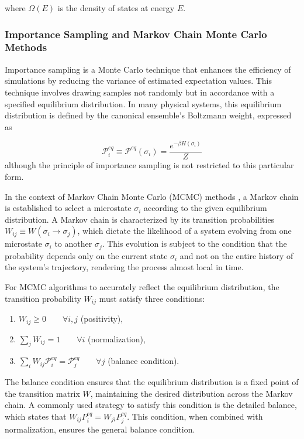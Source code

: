 where $\Omega(E)$ is the density of states at energy $E$.

\subsubsection{Importance Sampling and Markov Chain Monte Carlo Methods}

Importance sampling \cite{Tokdar2009} is a Monte Carlo technique that enhances
the efficiency of simulations by reducing the variance of estimated expectation
values. This technique involves drawing samples not randomly but in accordance
with a specified equilibrium distribution. In many physical systems, this
equilibrium distribution is defined by the canonical ensemble's Boltzmann
weight, expressed as 

\begin{equation}
    \mathcal{P}^{eq}_i \equiv \mathcal{P}^{eq}(\sigma_i) = \frac{e^{-\beta H(\sigma_i)}}{Z}
\end{equation}
although the principle of importance sampling is not restricted to this
particular form.

In the context of Markov Chain Monte Carlo (MCMC) methods \cite{Brooks1998}, a
Markov chain is established to select a microstate \( \sigma_i \) according to
the given equilibrium distribution. A Markov chain is characterized by its
transition probabilities \( W_{ij} \equiv W(\sigma_i \rightarrow \sigma_j) \),
which dictate the likelihood of a system evolving from one microstate \(
\sigma_i \) to another \( \sigma_j \). This evolution is subject to the
condition that the probability depends only on the current state \( \sigma_i \)
and not on the entire history of the system's trajectory, rendering the process
almost local in time.

For MCMC algorithms to accurately reflect the equilibrium distribution, the
transition probability \( W_{ij} \) must satisfy three conditions:

\begin{enumerate}
    \item \( W_{ij} \geq 0 \qquad \forall i, j \) (positivity),
    \item \( \sum_j W_{ij} = 1  \qquad \forall i \) (normalization),
    \item \( \sum_i W_{ij} \mathcal{P}^{eq}_i = \mathcal{P}^{eq}_j \qquad
    \forall j \) (balance condition).
\end{enumerate}

The balance condition ensures that the equilibrium distribution is a fixed point
of the transition matrix \( W \), maintaining the desired distribution across
the Markov chain. A commonly used strategy to satisfy this condition is the
detailed balance, which states that \( W_{ij} P^{eq}_i = W_{ji} P^{eq}_j \).
This condition, when combined with normalization, ensures the general balance
condition.

